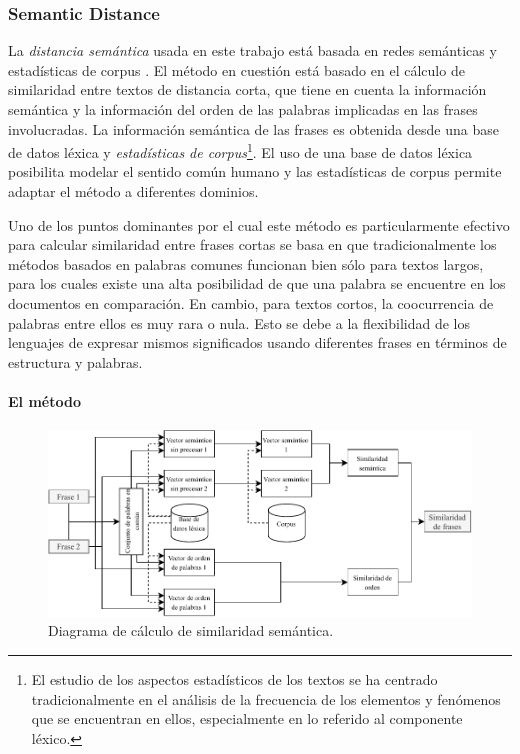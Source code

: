 \subsubsection{Semantic Distance}
La \textit{distancia semántica} usada en este trabajo está basada en redes semánticas y estadísticas de corpus \citep{li2006sentence}. El método en cuestión está basado en el cálculo de similaridad entre textos de distancia corta, que tiene en cuenta la información semántica y la información del orden de las palabras implicadas en las frases involucradas. La información semántica de las frases es obtenida desde una base de datos léxica y \textit{estadísticas de corpus}\footnote{El estudio de los aspectos estadísticos de los textos se ha centrado tradicionalmente en el análisis de la frecuencia de los elementos y fenómenos que se encuentran en ellos, especialmente en lo referido al componente léxico.}. El uso de una base de datos léxica posibilita modelar el sentido común humano y las estadísticas de corpus permite adaptar el método a diferentes dominios.

\bigskip Uno de los puntos dominantes por el cual este método es particularmente efectivo para calcular similaridad entre frases cortas se basa en que tradicionalmente los métodos basados en palabras comunes funcionan bien sólo para textos largos, para los cuales existe una alta posibilidad de que una palabra se encuentre en los documentos en comparación. En cambio, para textos cortos, la coocurrencia de palabras entre ellos es muy rara o nula. Esto se debe a la flexibilidad de los lenguajes de expresar mismos significados usando diferentes frases en términos de estructura y palabras.

\paragraph{El método}
\begin{figure}[h!]
	\centering
	\includegraphics[width=0.9\linewidth]{7_marco_teorico/imagenes/similaridad_sematinca_metodo}
	\caption{Diagrama de cálculo de similaridad semántica.}
	\label{fig:similaridadsematincametodo}
\end{figure}

